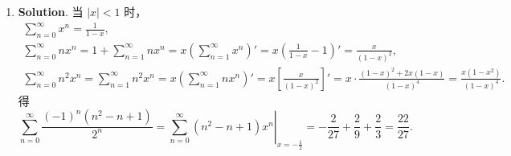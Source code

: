 \documentclass[../Main.tex]{subfiles}
\begin{document}
\begin{enumerate}
  \item \textbf{Solution}. 当 \(|x|<1\) 时，
        \[
          \begin{gathered}
            \sum_{n=0}^{\infty}x^n=\frac{1}{1-x},\\
            \sum_{n=0}^{\infty}nx^n=1+\sum_{n=1}^{\infty}nx^n=x\left(\sum_{n=1}^{\infty}x^{n}\right)'=x\left(\frac{1}{1-x}-1\right)'=\frac{x}{(1-x)^2},\\
            \sum_{n=0}^{\infty}n^2x^n=\sum_{n=1}^{\infty}n^2 x^n=x\left(\sum_{n=1}^{\infty}n x^{n}\right)'=x\left[\frac{x}{(1-x)^2}\right]'=x\cdot\frac{(1-x)^2+2x(1-x)}{(1-x)^4}=\frac{x(1-x^2)}{(1-x)^4}.
          \end{gathered}
        \]
        得
        \[
          \sum_{n=0}^{\infty}\frac{(-1)^n(n^2-n+1)}{2^n}
          =\left.\sum_{n=0}^{\infty}(n^2-n+1)x^n\right|_{x=-\frac{1}{2}}
          =-\frac{2}{27}+\frac{2}{9}+\frac{2}{3}
          =\frac{22}{27}.
        \]
\end{enumerate}
\end{document}
